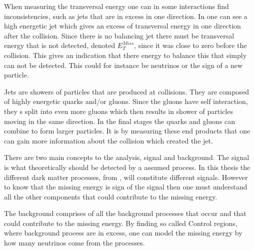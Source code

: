 When measuring the transversal energy one can in some interactions find inconsistencies, such as jets that are in excess in one direction. In  one can see a high energetic jet which gives an excess of transversal energy in one direction after the collision. Since there is no balancing jet there must be transversal energy that is not detected, denoted $E_T^{Miss}$, since it was close to zero before the collision. This gives an indication that there energy to balance this that simply can not be detected. This could for instance be neutrinos or the sign of a new particle.

Jets are showers of particles that are produced at collisions. They are composed of highly energetic quarks and/or gluons. Since the gluons have self interaction, they s split into even more gluons which then results in shower of particles moving in the same direction. In the final stages the quarks and gluons can combine to form larger particles. It is by measuring these end products that one can gain more information about the collision which created the jet.

There are two main concepts to the analysis, signal and background. The signal is what theoretically should be detected by a assumed process. In this thesis the different dark matter processes, from , will constitute different signals. However to know that the missing energy is sign of the signal then one must understand all the other components that could contribute to the missing energy.

The background comprises of all the background processes that occur and that could contribute to the missing energy. By finding so called Control regions, where background process are in excess, one can model the missing energy by how many neutrinos come from the processes. 

